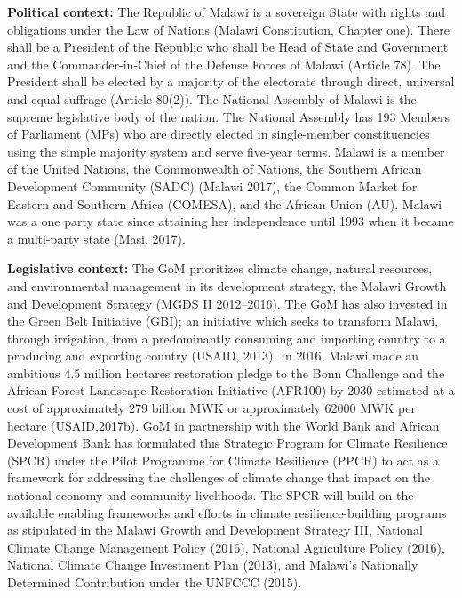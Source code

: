 \documentclass[
]{book}
\begin{document}
\textbf{Political context:} The Republic of Malawi is a sovereign State with rights and obligations under the Law of Nations (Malawi Constitution, Chapter one). There
shall be a President of the Republic who shall be Head of State and Government and the Commander-in-Chief of the Defense Forces of Malawi (Article 78). The
President shall be elected by a majority of the electorate through direct, universal and equal suffrage (Article 80(2)). The National Assembly of Malawi is the
supreme legislative body of the nation. The National Assembly has 193 Members of Parliament (MPs) who are directly elected in single-member constituencies using
the simple majority system and serve five-year terms. Malawi is a member of the United Nations, the Commonwealth of Nations, the Southern African Development
Community (SADC) (Malawi 2017), the Common Market for Eastern and Southern Africa (COMESA), and the African Union (AU). Malawi was a one party state since
attaining her independence until 1993 when it became a multi-party state (Masi, 2017).

\textbf{Legislative context:} The GoM prioritizes climate change, natural resources, and environmental management in its development strategy, the Malawi Growth and
Development Strategy (MGDS II 2012--2016). The GoM has also invested in the Green Belt Initiative (GBI); an initiative which seeks to transform Malawi, through
irrigation, from a predominantly consuming and importing country to a producing and exporting country (USAID, 2013). In 2016, Malawi made an ambitious 4.5
million hectares restoration pledge to the Bonn Challenge and the African Forest Landscape Restoration Initiative (AFR100) by 2030 estimated at a cost of
approximately 279 billion MWK or approximately 62000 MWK per hectare (USAID,2017b). GoM in partnership with the World Bank and African Development Bank has
formulated this Strategic Program for Climate Resilience (SPCR) under the Pilot Programme for Climate Resilience (PPCR) to act as a framework for addressing the
challenges of climate change that impact on the national economy and community livelihoods. The SPCR will build on the available enabling frameworks and efforts
in climate resilience-building programs as stipulated in the Malawi Growth and Development Strategy III, National Climate Change Management Policy (2016),
National Agriculture Policy (2016), National Climate Change Investment Plan (2013), and Malawi's Nationally Determined Contribution under the UNFCCC (2015).
\end{document}
